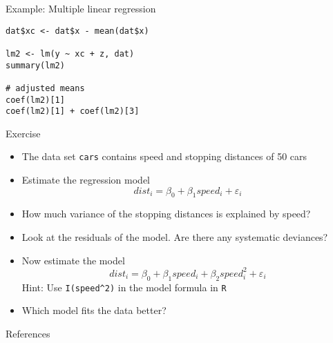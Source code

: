 \documentclass{beamer}
\begin{document}
{

\begin{frame}[fragile]{Example: Multiple linear regression}
\begin{lstlisting}
dat$xc <- dat$x - mean(dat$x)

lm2 <- lm(y ~ xc + z, dat)
summary(lm2)

# adjusted means
coef(lm2)[1]
coef(lm2)[1] + coef(lm2)[3]
\end{lstlisting}
\end{frame}

}

\begin{frame}[fragile]{}
  \begin{block}{Exercise}
    \begin{itemize}
      \item The data set \texttt{cars} contains speed and stopping
        distances of 50 cars
      \item Estimate the regression model
\[
  dist_i = \beta_0 + \beta_1 speed_i + \varepsilon_i
\]\vspace{-.8cm}
      \item How much variance of the stopping distances is explained by
      speed? \item Look at the residuals of the model. Are there any
        systematic deviances?
      \item Now estimate the model
\[
  dist_i = \beta_0 + \beta_1 speed_i + \beta_2 speed^2_i + \varepsilon_i
\]
        Hint: Use \verb+I(speed^2)+ in the model formula in \texttt{R}
      \item Which model fits the data better?
    \end{itemize}
  \end{block}
\end{frame}

\appendix
\begin{frame}{References}
\renewcommand{\bibfont}{\footnotesize}


\vfill
\end{frame}
\end{document}
